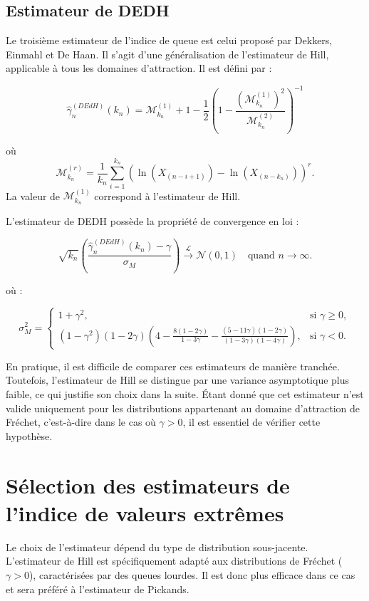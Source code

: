 \documentclass{article}
\begin{document}
\subsection{Estimateur de DEDH}
Le troisième estimateur de l'indice de queue est celui proposé par Dekkers, Einmahl et De Haan. Il s'agit d'une généralisation de l'estimateur de Hill, applicable à tous les domaines d'attraction. Il est défini par :

\[
\hat{\gamma}_n^{(DEdH)}(k_n) = \mathcal{M}^{(1)}_{k_n} + 1 - \frac{1}{2} \left( 1 - \frac{(\mathcal{M}^{(1)}_{k_n})^2}{\mathcal{M}^{(2)}_{k_n}} \right)^{-1}
\]

où 
\[
\mathcal{M}^{(r)}_{k_n} = \frac{1}{k_n} \sum_{i=1}^{k_n} (\ln(X_{(n-i+1)}) - \ln(X_{(n-k_n)}))^r.
\]
La valeur de \(\mathcal{M}^{(1)}_{k_n}\) correspond à l'estimateur de Hill.

L'estimateur de DEDH possède la propriété de convergence en loi :

\[
\sqrt{k_n}(\frac{\hat{\gamma}_n^{(DEdH)}(k_n) - \gamma}{\sigma_M}) \xrightarrow{\mathcal{L}} \mathcal{N}(0,1) \quad \text{quand } n \to \infty.
\]

où :

\[
\sigma_M^2 = 
\begin{cases} 
1 + \gamma^2, & \text{si } \gamma \geq 0, \\ 
(1 - \gamma^2)(1 - 2\gamma)
\left( 4 - \frac{8 (1 - 2\gamma)}{1 - 3\gamma} - \frac{(5 - 11\gamma)(1 - 2\gamma)}{(1 - 3\gamma)(1 - 4\gamma)} \right), 
& \text{si } \gamma < 0.
\end{cases}
\]

En pratique, il est difficile de comparer ces estimateurs de manière tranchée. Toutefois, l'estimateur de Hill se distingue par une variance asymptotique plus faible, ce qui justifie son choix dans la suite. Étant donné que cet estimateur n'est valide uniquement pour les distributions appartenant au domaine d'attraction de Fréchet, c'est-à-dire dans le cas où \(\gamma > 0\), il est essentiel de vérifier cette hypothèse. 

\section{Sélection des estimateurs de l'indice de valeurs extrêmes}

Le choix de l’estimateur dépend du type de distribution sous-jacente. L’estimateur de Hill est spécifiquement adapté aux distributions de Fréchet (\(\gamma > 0\)), caractérisées par des queues lourdes. Il est donc plus efficace dans ce cas et sera préféré à l’estimateur de Pickands.  
\end{document}
